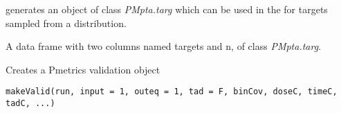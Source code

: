 \documentclass[a4paper]{book}
\begin{document}
%
\begin{Details}\relax
{} generates an object of class \emph{PMpta.targ} which can
be used in the  for targets sampled from a distribution.
\end{Details}
%
\begin{Value}
A data frame with two columns named targets and n, of class \emph{PMpta.targ}.
\end{Value}
%
\begin{SeeAlso}\relax
{}
\end{SeeAlso}
%
\begin{Description}\relax
Creates a Pmetrics validation object
\end{Description}
%
\begin{Usage}
\begin{verbatim}
makeValid(run, input = 1, outeq = 1, tad = F, binCov, doseC, timeC, tadC, ...)
\end{verbatim}
\end{Usage}
%
\end{document}
